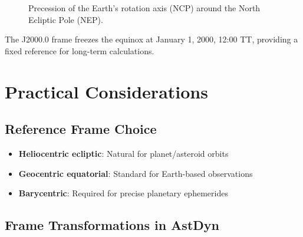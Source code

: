 \begin{figure}[H]
\centering
{}
\caption{Precession of the Earth's rotation axis (NCP) around the North Ecliptic Pole (NEP).}
\label{fig:precession_coords}
\end{figure}

The J2000.0 frame freezes the equinox at January 1, 2000, 12:00 TT, providing a fixed reference for long-term calculations.

\section{Practical Considerations}

\subsection{Reference Frame Choice}

\begin{itemize}
    \item \textbf{Heliocentric ecliptic}: Natural for planet/asteroid orbits
    \item \textbf{Geocentric equatorial}: Standard for Earth-based observations
    \item \textbf{Barycentric}: Required for precise planetary ephemerides
\end{itemize}

\subsection{Frame Transformations in AstDyn}

